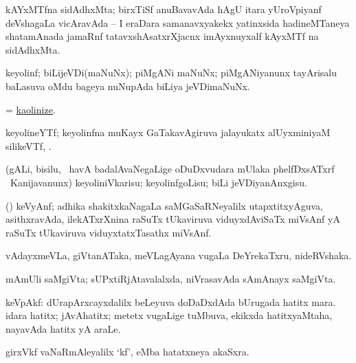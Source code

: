 \bentry
{}
\gl{\nA}
\bmng
kAYxMTfna sidAdhxMta; birxTiSf anuBavavAda hAgU itara yUroVpiyanf deVshagaLa vicAravAda -- I eraDara samanavxyakekx yatinxsida hadineMTaneya shatamAnada jamaRnf tatavxshAsatxrXjacnx imAyxnuyxalf kAyxMTf na sidAdhxMta. 
\emng
\eentry

\bentry
{}
\gl{\saMkiSx}
\bmng
{} 
\emng
\eentry

\bentry
{}
\gl{\nA}
\bmng
keyolinf; biLijeVDi(maNuNx); piMgANi maNuNx; piMgANiyanunx tayArisalu baLasuva oMdu bageya nuNupAda biLiya jeVDimaNuNx. 
\emng
\eentry

\bentry
{}
\gl{\sakirx}
\bmng
 = \hyperlink{kaolinize}{kaolinize}. 
\emng
\eentry

\bentry
{}
\gl{\nA}
\bmng
keyolineYTf; keyolinfna muKayx GaTakavAgiruva jalayukatx alUyxminiyaM silikeVTf, . 
\emng
\eentry

\bentry
{}
\gl{\sakirx}
\bmng
(gALi, bisilu, \mo\ havA badalAvaNegaLige oDuDxvudara mUlaka phelfDxsATxrf \mo\ Kanijavanunx) keyoliniVkarisu; keyolinfgoLisu; biLi jeVDiyanAnxgisu. 
\emng
\eentry

\bentry
{}
\gl{\nA}
\bmng
(\Bwvi) keVyAnf; adhika shakitxkaNagaLa saMGaSaRNeyalilx utapxtitxyAguva, asithxravAda, ilekATxrXnina raSuTx tUkaviruva viduyxdAviSaTx miVsAnf yA raSuTx tUkaviruva viduyxtatxTasathx miVsAnf. 
\emng
\eentry

\bentry
{}
\gl{\nA}
\bmng
vAdayxmeVLa, giVtanATaka, meVLagAyana \mo vugaLa DeYrekaTxru, nideRVshaka. 
\emng
\eentry

\bentry
{}
\gl{\nA}
\bmng
mAmUli saMgiVta; sUPxtiRjAtavalalxda, niVrasavAda sAmAnayx saMgiVta. 
\emng
\eentry

\bentry
{}
\gl{\nA}
\bmng
keVpAkf: 
\banum
{} dUrapArxcayxdalilx beLeyuva doDaDxdAda bUrugada hatitx mara. 
 idara hatitx; jAvAhatitx; metetx \mo vugaLige tuMbuva, ekikxda hatitxyaMtaha, nayavAda hatitx yA araLe. 
\eanum
\emng
\eentry

\bentry
{}
\gl{\nA}
\bmng
girxVkf vaNaRmAleyalilx `kf',  eMba hatatxneya akaSxra. 
\emng
\eentry

